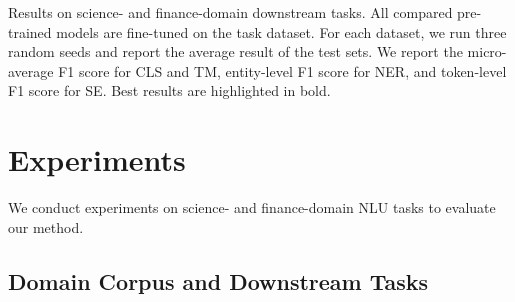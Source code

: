\documentclass[11pt]{article}
\begin{document}
\begin{table*}[t]
    \centering
      \resizebox{0.9\linewidth}{!}{}
    \caption{Results on 
    science- and finance-domain downstream tasks.
    All compared pre-trained models are fine-tuned on the task dataset.
    For each dataset, we run three random seeds and report the average result of the test sets.
    We report the micro-average F1 score for CLS and TM, entity-level F1 score for NER, and token-level F1 score for SE.
    Best results are highlighted in bold.}
    \label{tab:results}
\end{table*}
\section{Experiments}
We conduct experiments on science- and finance-domain NLU tasks to evaluate our method.

\subsection{Domain Corpus and Downstream Tasks}



\begin{table}[t]
    \centering
    \caption{Average results on all downstream tasks against different corpus sizes of pre-training.
     is the corpus size for corresponding domain.}
    \label{tab:pretrain_corpus}
\end{table}
\end{document}
